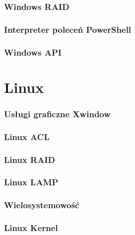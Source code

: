 \documentclass[a4paper,twoside]{article}
\begin{document}
	\section{Windows RAID}
	
	\section{Interpreter poleceń PowerShell}
	
	\section{Windows API}
	
\part{Linux}
	\section{Usługi graficzne Xwindow}
	
	\section{Linux ACL}
	
	\section{Linux RAID}
	
	\section{Linux LAMP}
	
	\section{Wielosystemowość}
	
	\section{Linux Kernel}
\end{document}
